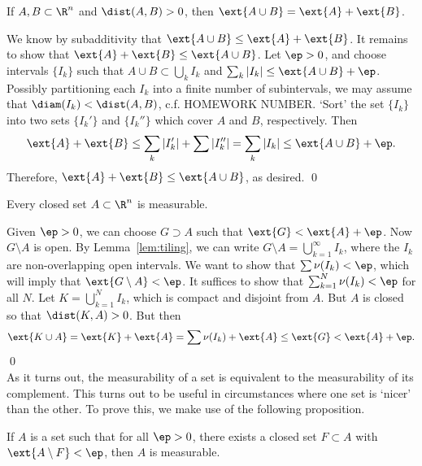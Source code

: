 \begin{lem} \label{lem:omaddjs}
If $A, B \subset \R^n$ and $\dist(A,B)>0$, then $\ext{A \cup B}= \ext{A}+\ext{B}$. 
\end{lem}

\pf We know by subadditivity that $\ext{A \cup B} \leq \ext{A}+\ext{B}$. It remains to show that $\ext{A}+\ext{B} \leq \ext{A \cup B}$. Let $\ep>0$, and choose intervals $\{I_k\}$ such that $A \cup B \subset \bigcup_k I_k$ and $\sum_k |I_k| \leq \ext{A \cup B} + \ep$. Possibly partitioning each $I_k$ into a finite number of subintervals, we may assume that $\diam(I_k)<\dist(A,B)$, c.f. HOMEWORK NUMBER. `Sort' the set $\{I_k\}$ into two sets $\{I_k'\}$ and $\{I_k''\}$ which cover $A$ and $B$, respectively. Then
	\[
	\ext{A}+\ext{B} \leq \sum_k |I_k'| + \sum |I_k''| = \sum_k |I_k| \leq \ext{A \cup B} + \ep.
	\]
Therefore, $\ext{A} + \ext{B} \leq \ext{A \cup B}$, as desired. \qed \\



\begin{thm} \label{thm:closedmeas}
Every closed set $A \subset \R^n$ is measurable. 
\end{thm}

\pf Given $\ep>0$, we can choose $G \supset A$ such that $\ext{G}<\ext{A}+\ep$. Now $G \setminus A$ is open. By Lemma~\ref{lem:tiling}, we can write $G\setminus A=\bigcup_{k=1}^\infty I_k$, where the $I_k$ are non-overlapping open intervals. We want to show that $\sum \nu(I_k)<\ep$, which will imply that $\ext{G \setminus A}<\ep$. It suffices to show that $\sum_{k=1}^N \nu(I_k)<\ep$ for all $N$. Let $K= \bigcup_{k=1}^N I_k$, which is compact and disjoint from $A$. But $A$ is closed so that $\dist(K,A)>0$. But then 
	\[
	\ext{K \cup A}=\ext{K}+\ext{A}= \sum \nu(I_k) + \ext{A} \leq \ext{G} < \ext{A} + \ep.
	\] \qed \\




As it turns out, the measurability of a set is equivalent to the measurability of its complement. This turns out to be useful in circumstances where one set is `nicer' than the other. To prove this, we make use of the following proposition. 









\begin{prop} \label{prop:nearclosedmeas}
If $A$ is a set such that for all $\ep>0$, there exists a closed set $F \subset A$ with $\ext{A \setminus F}<\ep$, then $A$ is measurable. 
\end{prop}

